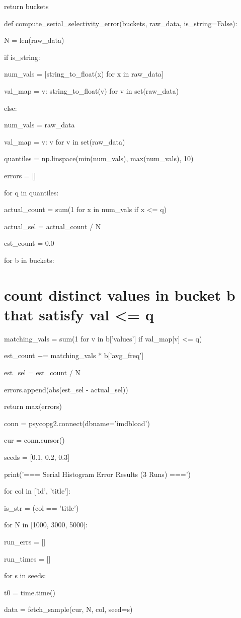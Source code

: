 \documentclass[11pt,a4paper]{article}
\begin{document}
return buckets


def compute\_serial\_selectivity\_error(buckets, raw\_data, is\_string=False):

N = len(raw\_data)

if is\_string:

num\_vals = [string\_to\_float(x) for x in raw\_data]

val\_map = {v: string\_to\_float(v) for v in set(raw\_data)}

else:

num\_vals = raw\_data

val\_map = {v: v for v in set(raw\_data)}


quantiles = np.linspace(min(num\_vals), max(num\_vals), 10)

errors = []


for q in quantiles:

actual\_count = sum(1 for x in num\_vals if x <= q)

actual\_sel = actual\_count / N


est\_count = 0.0

for b in buckets:

\section{count distinct values in bucket b that satisfy val <= q}
matching\_vals = sum(1 for v in b['values'] if val\_map[v] <= q)

est\_count += matching\_vals * b['avg\_freq']


est\_sel = est\_count / N

errors.append(abs(est\_sel - actual\_sel))


return max(errors)


conn = psycopg2.connect(dbname='imdbload')

cur = conn.cursor()


seeds = [0.1, 0.2, 0.3]

print('=== Serial Histogram Error Results (3 Runs) ===')

for col in ['id', 'title']:

is\_str = (col == 'title')

for N in [1000, 3000, 5000]:

run\_errs = []

run\_times = []

for s in seeds:

t0 = time.time()

data = fetch\_sample(cur, N, col, seed=s)
\end{document}
